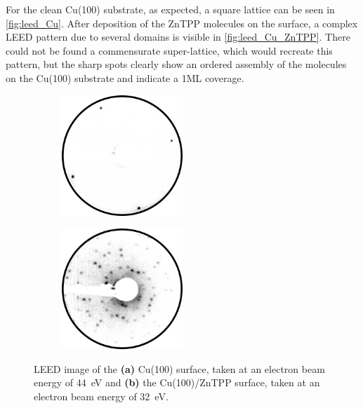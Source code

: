 For the clean Cu(100) substrate, as expected, a square lattice can be seen in \autoref{fig:leed_Cu}.
After deposition of the ZnTPP molecules on the surface, a complex LEED pattern due to several domains is visible in \autoref{fig:leed_Cu_ZnTPP}.
There could not be found a commensurate super-lattice, which would recreate this pattern, but the sharp spots clearly show an ordered assembly of the molecules on the Cu(100) substrate and indicate a 1ML coverage.
\begin{figure}[h]
    \centering
    \begin{subfigure}{0.49\textwidth}
        \centering
        \includegraphics[width = 0.5\textwidth]{Plots/Cu.png}
        \caption{}
        \label{fig:leed_Cu}
    \end{subfigure}
    \hfill
    \begin{subfigure}{0.49\textwidth}
        \centering
        \includegraphics[width = 0.5\textwidth]{Plots/Cu_ZnTPP.png}
        \caption{}
        \label{fig:leed_Cu_ZnTPP}
    \end{subfigure}
    \caption{LEED image of the \textbf{(a)} Cu(100) surface, taken at an electron beam energy of \qty{44}{eV} and \textbf{(b)} the Cu(100)/ZnTPP surface, taken at an electron beam energy of \qty{32}{eV}.}
    \label{fig:leed_2}
\end{figure}
\FloatBarrier


